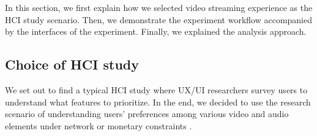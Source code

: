 
In this section, we first explain how we selected video streaming experience as the HCI study scenario. Then, we demonstrate the experiment workflow accompanied by the interfaces of the experiment. Finally, we explained the analysis approach.

 
\subsection{Choice of HCI study} \label{exp2-hci}
We set out to find a typical HCI study where UX/UI researchers survey users to understand what features to prioritize. In the end, we decided to use the research scenario of understanding users' preferences among various video and audio elements under network or monetary constraints \cite{molnar2013comedy, oeldorf2012bad}.

